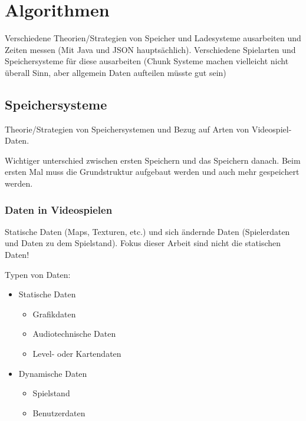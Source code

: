 \chapter{Algorithmen}\label{ch:algorithmen}

Verschiedene Theorien/Strategien von Speicher und Ladesysteme ausarbeiten und Zeiten messen (Mit Java und JSON hauptsächlich). Verschiedene Spielarten und Speichersysteme für diese ausarbeiten (Chunk Systeme machen vielleicht nicht überall Sinn, aber allgemein Daten aufteilen müsste gut sein)




\section{Speichersysteme}\label{sect:speichersysteme}
Theorie/Strategien von Speichersystemen und Bezug auf Arten von Videospiel-Daten.

Wichtiger unterschied zwischen ersten Speichern und das Speichern danach. Beim ersten Mal muss die Grundstruktur aufgebaut werden und auch mehr gespeichert werden.


\subsection{Daten in Videospielen}
Statische Daten (Maps, Texturen, etc.) und sich ändernde Daten (Spielerdaten und 
Daten zu dem Spielstand). Fokus dieser Arbeit sind nicht die statischen Daten!

Typen von Daten:\\
\begin{itemize}
    \item Statische Daten
    \begin{itemize}
        \item Grafikdaten
        \item Audiotechnische Daten
        \item Level- oder Kartendaten
    \end{itemize}
    \item Dynamische Daten
    \begin{itemize}
        \item Spielstand
        \item Benutzerdaten
    \end{itemize}
\end{itemize}


